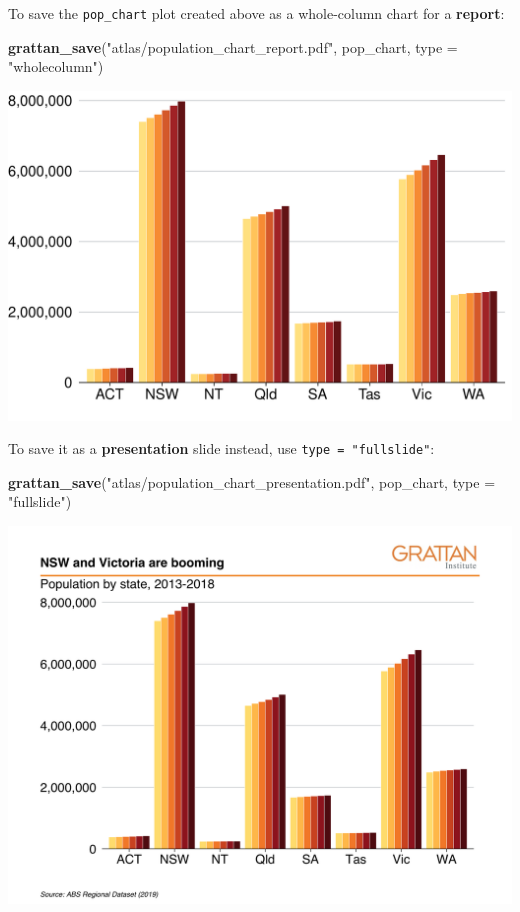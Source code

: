 \documentclass[]{book}
\newenvironment{Shaded}{\begin{snugshade}}{\end{snugshade}}
\newcommand{\DataTypeTok}[1]{\textcolor[rgb]{0.13,0.29,0.53}{#1}}
\newcommand{\KeywordTok}[1]{\textcolor[rgb]{0.13,0.29,0.53}{\textbf{#1}}}
\newcommand{\NormalTok}[1]{#1}
\newcommand{\StringTok}[1]{\textcolor[rgb]{0.31,0.60,0.02}{#1}}
\begin{document}
To save the \texttt{pop\_chart} plot created above as a whole-column chart for a \textbf{report}:

\begin{Shaded}
\begin{Highlighting}[]
\KeywordTok{grattan_save}\NormalTok{(}\StringTok{"atlas/population_chart_report.pdf"}\NormalTok{, pop_chart, }\DataTypeTok{type =} \StringTok{"wholecolumn"}\NormalTok{)}
\end{Highlighting}
\end{Shaded}

\includegraphics[width=38.76in]{atlas/population_chart_report}

To save it as a \textbf{presentation} slide instead, use \texttt{type\ =\ "fullslide"}:

\begin{Shaded}
\begin{Highlighting}[]
\KeywordTok{grattan_save}\NormalTok{(}\StringTok{"atlas/population_chart_presentation.pdf"}\NormalTok{, pop_chart, }\DataTypeTok{type =} \StringTok{"fullslide"}\NormalTok{)}
\end{Highlighting}
\end{Shaded}

\includegraphics[width=44.44in]{atlas/population_chart_presentation}
\end{document}
